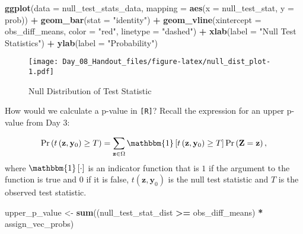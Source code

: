 \documentclass[12pt,leqno]{article}
\makeatletter
\newenvironment{Shaded}{\begin{snugshade}}{\end{snugshade}}
\newcommand{\DataTypeTok}[1]{\textcolor[rgb]{0.13,0.29,0.53}{#1}}
\newcommand{\KeywordTok}[1]{\textcolor[rgb]{0.13,0.29,0.53}{\textbf{#1}}}
\newcommand{\NormalTok}[1]{#1}
\newcommand{\OperatorTok}[1]{\textcolor[rgb]{0.81,0.36,0.00}{\textbf{#1}}}
\newcommand{\StringTok}[1]{\textcolor[rgb]{0.31,0.60,0.02}{#1}}
\def\maxwidth{\ifdim\Gin@nat@width>\linewidth\linewidth
\else\Gin@nat@width\fi}
\let\Oldincludegraphics\includegraphics
\renewcommand{\includegraphics}[1]{\Oldincludegraphics[width=\maxwidth]{#1}}
\theoremstyle{newstyle}
\makeatother
\begin{document}
\begin{Shaded}
\begin{Highlighting}[]
\KeywordTok{ggplot}\NormalTok{(}\DataTypeTok{data =}\NormalTok{ null_test_stats_data,}
                         \DataTypeTok{mapping =} \KeywordTok{aes}\NormalTok{(}\DataTypeTok{x =}\NormalTok{ null_test_stat,}
                                       \DataTypeTok{y =}\NormalTok{ prob)) }\OperatorTok{+}
\StringTok{  }\KeywordTok{geom_bar}\NormalTok{(}\DataTypeTok{stat =} \StringTok{"identity"}\NormalTok{) }\OperatorTok{+}
\StringTok{  }\KeywordTok{geom_vline}\NormalTok{(}\DataTypeTok{xintercept =}\NormalTok{ obs_diff_means,}
             \DataTypeTok{color =} \StringTok{"red"}\NormalTok{,}
             \DataTypeTok{linetype =} \StringTok{"dashed"}\NormalTok{) }\OperatorTok{+}
\StringTok{  }\KeywordTok{xlab}\NormalTok{(}\DataTypeTok{label =} \StringTok{"Null Test Statistics"}\NormalTok{) }\OperatorTok{+}
\StringTok{  }\KeywordTok{ylab}\NormalTok{(}\DataTypeTok{label =} \StringTok{"Probability"}\NormalTok{)}
\end{Highlighting}
\end{Shaded}

\begin{figure}
\centering
\texttt{[image: Day\_08\_Handout\_files/figure-latex/null\_dist\_plot-1.pdf]}
\caption{Null Distribution of Test Statistic}
\end{figure}

\newpage

How would we calculate a p-value in \texttt{[R]}? Recall the expression
for an upper p-value from Day 3:

\begin{equation}
\Pr\left(t\left(\mathbf{z}, \mathbf{y}_0 \right) \geq T \right) = \sum \limits_{\mathbf{z} \in \Omega} \mathbbm{1}\left[t\left(\mathbf{z}, \mathbf{y}_0 \right) \geq T\right] \Pr\left(\mathbf{Z} = \mathbf{z}\right),
\end{equation} where \(\mathbbm{1}\left[\cdot\right]\) is an indicator
function that is \(1\) if the argument to the function is true and \(0\)
if it is false, \(t\left(\mathbf{z}, \mathbf{y}_0 \right)\) is the null
test statistic and \(T\) is the observed test statistic.

\begin{Shaded}
\begin{Highlighting}[]
\NormalTok{upper_p_value <-}\StringTok{ }\KeywordTok{sum}\NormalTok{((null_test_stat_dist }\OperatorTok{>=}\StringTok{ }\NormalTok{obs_diff_means) }\OperatorTok{*}\StringTok{ }\NormalTok{assign_vec_probs)}
\end{Highlighting}
\end{Shaded}
\end{document}
